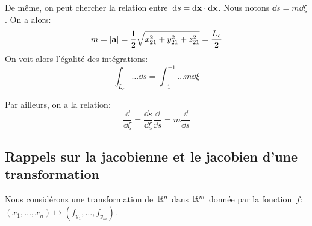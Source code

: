 \medskipvm
De même, on peut chercher la relation entre~$\dd s=\dd\VV{x}\cdot\dd\VV{x}$. Nous notons
$\dd s=m \dd \xi$. On a alors: 
\begin{equation}m=|\VV{a}| = \frac12 \sqrt{x_{21}^2+y_{21}^2+z_{21}^2} = \frac{L_e}2 \end{equation}
On voit alors l'égalité des intégrations:
\begin{equation}\int_{L_e} \ldots \dd s = \int_{-1}^{+1}\ldots m \dd \xi\end{equation}

\medskipvm
Par ailleurs, on a la relation:
\begin{equation} \frac{\dd}{ \dd \xi} = \frac{\dd s}{ \dd \xi}\frac{\dd}{\dd s}=m\frac{\dd}{\dd s}\end{equation}
\medskipvm
\subsection{Rappels sur la jacobienne et le jacobien d'une transformation}

Nous considérons une transformation de~$\mathbb R^n$ dans~$\mathbb R^m$ donnée par la fonction~$f$: 
$\left(x_1, \ldots, x_n \right) \mapsto \left(f_{y_1}, \ldots, f_{y_m} \right)$.
\ifVersionDuDocEstVincent

